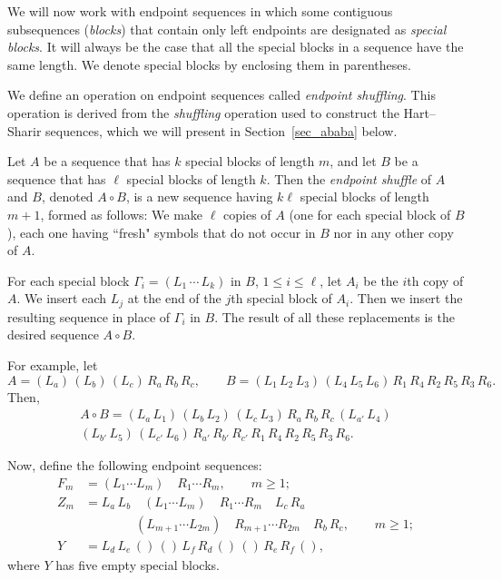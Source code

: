 \documentclass[11pt]{article}
\theoremstyle{definition}
\theoremstyle{remark}
\begin{document}
We will now work with endpoint sequences in which some contiguous subsequences (\emph{blocks}) that contain only left endpoints are designated as \emph{special blocks}. It will always be the case that all the special blocks in a sequence have the same length. We denote special blocks by enclosing them in parentheses.

We define an operation on endpoint sequences called \emph{endpoint shuffling}. This operation is derived from the \emph{shuffling} operation used to construct the Hart--Sharir sequences, which we will present in Section~\ref{sec_ababa} below.

Let $A$ be a sequence that has $k$ special blocks of length $m$, and let $B$ be a sequence that has $\ell$ special blocks of length $k$. Then the \emph{endpoint shuffle} of $A$ and $B$, denoted $A \circ B$, is a new sequence having $k\ell$ special blocks of length $m+1$, formed as follows: We make $\ell$ copies of $A$ (one for each special block of $B$), each one having ``fresh" symbols that do not occur in $B$ nor in any other copy of $A$.

For each special block $\Gamma_i = (L_1\, \cdots\, L_k)$ in $B$, $1\le i\le\ell$, let $A_i$ be the $i$th copy of $A$. We insert each $L_j$ at the end of the $j$th special block of $A_i$. Then we insert the resulting sequence in place of $\Gamma_i$ in $B$. The result of all these replacements is the desired sequence $A\circ B$.

For example, let 
\begin{equation*}
A = (L_a)\, (L_b)\, (L_c)\, R_a\, R_b\, R_c, \qquad B = (L_1\, L_2\, L_3)\, (L_4\, L_5\, L_6)\, R_1\, R_4\, R_2\, R_5\, R_3\, R_6.
\end{equation*}
Then,
\begin{multline*}
A\circ B = (L_a\, L_1)\, (L_b\, L_2)\, (L_c\, L_3)\, R_a\, R_b\, R_c\, (L_{a'}\, L_4)\\
(L_{b'}\, L_5)\, (L_{c'}\, L_6)\, R_{a'}\,R_{b'}\, R_{c'}\, R_1\, R_4\, R_2\, R_5\, R_3\, R_6.
\end{multline*}

Now, define the following endpoint sequences:
\begin{align*}
F_m &= (L_1\cdots L_m)\quad R_1\cdots R_m, \qquad m\ge 1;\\
Z_m &= L_a\, L_b\quad (L_1\cdots L_m)\quad R_1\cdots R_m\quad L_c\, R_a\\
&\qquad\qquad(L_{m+1}\cdots L_{2m})\quad R_{m+1}\cdots R_{2m}\quad R_b\, R_c, \qquad m\ge 1;\\
Y &= L_d\, L_e\, ()\, ()\, L_f\, R_d\, ()\, ()\, R_e\, R_f\, (),
\end{align*}
where $Y$ has five empty special blocks.
\end{document}

